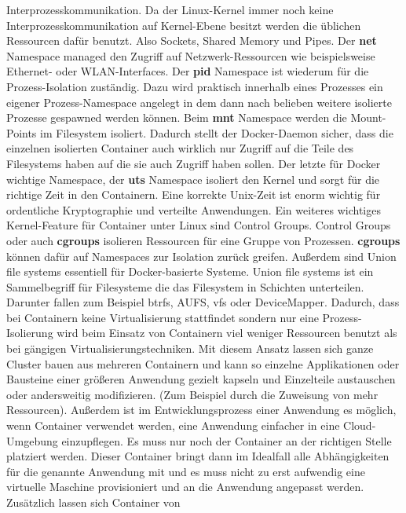 \documentclass[titlepage]{report}
\begin{document}
Interprozesskommunikation. Da der Linux\hyp{}Kernel immer noch keine
Interprozesskommunikation auf Kernel\hyp{}Ebene besitzt werden die
üblichen Ressourcen dafür benutzt. Also Sockets, Shared Memory und
Pipes.\cite{ipc} Der \textbf{net} Namespace managed den Zugriff auf
Netzwerk\hyp{}Ressourcen wie beispielsweise Ethernet\hyp{} oder
WLAN\hyp{}Interfaces. Der \textbf{pid} Namespace ist wiederum für die
Prozess\hyp{}Isolation zuständig. Dazu wird praktisch innerhalb eines
Prozesses ein eigener Prozess\hyp{}Namespace angelegt in dem dann nach
belieben weitere isolierte Prozesse gespawned werden können. Beim
\textbf{mnt} Namespace werden die Mount\hyp{}Points im Filesystem
isoliert. Dadurch stellt der Docker\hyp{}Daemon sicher, dass die
einzelnen isolierten Container auch wirklich nur Zugriff auf die Teile
des Filesystems haben auf die sie auch Zugriff haben sollen. Der letzte
für Docker wichtige Namespace, der \textbf{uts} Namespace isoliert den
Kernel und sorgt für die richtige Zeit in den Containern. Eine korrekte
Unix\hyp{}Zeit ist enorm wichtig für ordentliche Kryptographie und
verteilte Anwendungen. Ein weiteres wichtiges Kernel\hyp{}Feature für
Container unter Linux sind Control Groups. Control Groups oder auch
\textbf{cgroups} isolieren Ressourcen für eine Gruppe von
Prozessen.\cite{cgroups} \textbf{cgroups} können dafür auf
Namespaces zur Isolation zurück greifen. Außerdem sind Union file
systems essentiell für Docker\hyp{}basierte Systeme. Union file systems
ist ein Sammelbegriff für Filesysteme die das Filesystem in Schichten
unterteilen. Darunter fallen zum Beispiel btrfs, AUFS, vfs oder
DeviceMapper.\cite{docker}
Dadurch, dass bei Containern keine Virtualisierung stattfindet sondern
nur eine Prozess\hyp{}Isolierung wird beim Einsatz von Containern viel
weniger Ressourcen benutzt als bei gängigen Virtualisierungstechniken.
Mit diesem Ansatz lassen sich ganze Cluster bauen aus mehreren
Containern und kann so einzelne Applikationen oder Bausteine einer
größeren Anwendung gezielt kapseln und Einzelteile austauschen oder
andersweitig modifizieren. (Zum Beispiel durch die Zuweisung von mehr
Ressourcen). Außerdem ist im Entwicklungsprozess einer Anwendung es
möglich, wenn Container verwendet werden, eine Anwendung einfacher in
eine Cloud\hyp{}Umgebung einzupflegen. Es muss nur noch der Container an
der richtigen Stelle platziert werden. Dieser Container bringt dann im
Idealfall alle Abhängigkeiten für die genannte Anwendung mit und es muss
nicht zu erst aufwendig eine virtuelle Maschine provisioniert und an die
Anwendung angepasst werden. Zusätzlich lassen sich Container von
\end{document}
